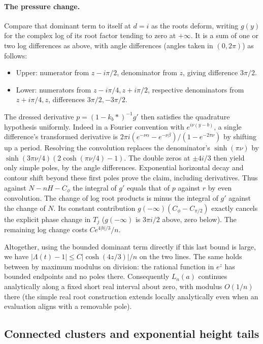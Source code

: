 \documentclass[11pt]{article}
\numberwithin{equation}{section}
\theoremstyle{definition}\newtheorem{definition}[theorem]{Definition}
\theoremstyle{remark}\newtheorem{remark}[theorem]{Remark}
\begin{document}
\paragraph{The pressure change.}
Compare that dominant term to itself at \(d=i\) as the roots deform, writing \(g(y)\) for the complex log of its root factor tending to zero at \(+\infty\). It is a sum of one or two log differences as above, with angle differences (angles taken in \((0,2\pi)\)) as follows:
\begin{itemize}
\item Upper: numerator from \(z-i\pi/2\), denominator from \(z\), giving difference \(3\pi/2\).
\item Lower: numerators from \(z-i\pi/4,z+i\pi/2\), respective denominators from \(z+i\pi/4,z\), differences \(3\pi/2,-3\pi/2\).
\end{itemize}

The dressed derivative \(p=(1-k_b*)^{-1}g'\) then satisfies the quadrature hypothesis uniformly. Indeed in a Fourier convention with \(e^{i\nu(y-b)}\), a single difference's transformed derivative is \(2\pi i(e^{-\nu\alpha}-e^{-\nu\beta})/(1-e^{-2\pi\nu})\) by shifting up a period. Resolving the convolution replaces the denominator's \(\sinh(\pi\nu)\) by \(\sinh(3\pi\nu/4)(2\cosh(\pi\nu/4)-1)\). The double zeros at \(\pm4i/3\) then yield only simple poles, by the angle differences. Exponential horizontal decay and contour shift beyond these first poles prove the claim, including derivatives. Thus against \(N-nH-C_\phi\) the integral of \(g'\) equals that of \(p\) against \(r\) by even convolution. The change of log root products is minus the integral of \(g'\) against the change of \(N\). Its constant contribution \(g(-\infty)(C_\phi-C_{\pi/2})\) exactly cancels the explicit phase change in \(T_j\) (\(g(-\infty)\) is \(3\pi i/2\) above, zero below). The remaining log change costs \(C e^{4|b|/3}/n\).

Altogether, using the bounded dominant term directly if this last bound is large, we have \(|\Lambda(t)-1|\le C |\cosh(4z/3)|/n\) on the two lines. The same holds between by maximum modulus on division: the rational function in \(e^z\) has bounded endpoints and no poles there. Consequently \(L_n(a)\) continues analytically along a fixed short real interval about zero, with modulus \(O(1/n)\) there (the simple real root construction extends locally analytically even when an evaluation aligns with a removable pole).

\subsection{Connected clusters and exponential height tails}
\end{document}
